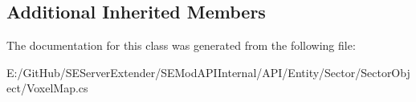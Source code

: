 \subsection*{Additional Inherited Members}


The documentation for this class was generated from the following file\+:\begin{DoxyCompactItemize}
\item 
E\+:/\+Git\+Hub/\+S\+E\+Server\+Extender/\+S\+E\+Mod\+A\+P\+I\+Internal/\+A\+P\+I/\+Entity/\+Sector/\+Sector\+Object/Voxel\+Map.\+cs\end{DoxyCompactItemize}
